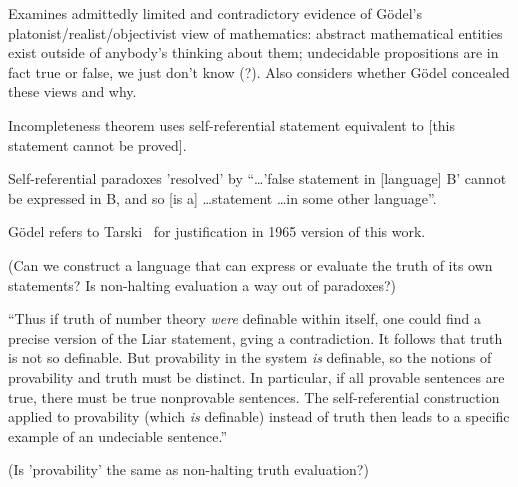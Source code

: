 \label{sec:Godels_life_and_work}

\cite[ch~6 ``G\"{o}del's life and work'']{Feferman1998LightOfLogic}

\label{sec:Kurt_Godel_conviction_and_caution}

Examines admittedly limited and contradictory evidence
of G\"{o}del's platonist/realist/objectivist view of
mathematics: abstract mathematical entities exist outside 
of anybody's thinking about them;
undecidable propositions are in fact true or false, we just don't
know (?).
Also considers whether G\"{o}del concealed these views and 
why.~\cite[ch~7 ``Kurt G\"{o}del: conviction and caution'']{Feferman1998LightOfLogic}

Incompleteness theorem uses self-referential statement
equivalent to [this statement cannot be 
proved].~\cite[p~156]{Feferman1998LightOfLogic}

Self-referential paradoxes 'resolved' by 
``\ldots 'false statement in [language] B' cannot be expressed in
B, and so [is a] \ldots statement \ldots in some other 
language''.~\cite[p~157]{Feferman1998LightOfLogic}

G\"{o}del refers to 
Tarski~\cite{tarski1944semanticTruth,tarski1983logic} 
for justification in 1965 version 
of this work.~\cite{godel1986CollectedI}
 
(Can we construct a language that can express 
or evaluate the truth of 
its own statements? 
Is non-halting evaluation a way out of paradoxes?)

``Thus if truth of number theory \textit{were}
definable within itself, one could find a precise version of the
Liar statement, gving a contradiction.
It follows that truth is not so definable.
But provability in the system \textit{is} definable,
so the notions of provability and truth must be distinct.
In particular, if all provable sentences are true,
there must be true nonprovable sentences.
The self-referential construction applied to provability
(which \textit{is} definable) instead of truth then 
leads to a specific example of an undeciable 
sentence.''~\cite[p~159]{Feferman1998LightOfLogic}

(Is 'provability' the same as non-halting truth evaluation?)

